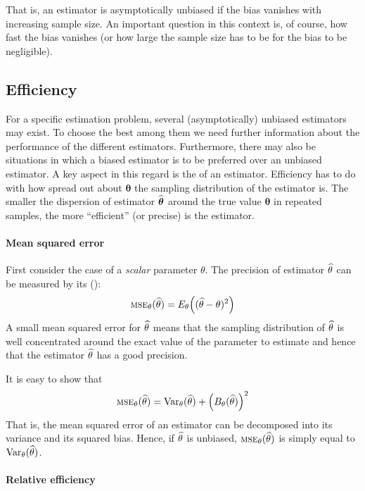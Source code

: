 That is, an estimator is asymptotically unbiased if the bias vanishes with 
increasing sample size. An important question in this context is, of course, how 
fast the bias vanishes (or how large the sample size has to be for the bias to be 
negligible).

\subsection{Efficiency}

For a specific estimation problem, several (asymptotically) unbiased estimators
may exist. To choose the best among them we need further information about the
performance of the different estimators. Furthermore, there may also be
situations in which a biased estimator is to be preferred over an unbiased
estimator. A key aspect in this regard is the \emph{} of an
estimator. Efficiency has to do with how spread out about $\boldsymbol\theta$
the sampling distribution of the estimator is. The smaller the dispersion of
estimator $\widehat{\boldsymbol\theta}$ around the true value
$\boldsymbol\theta$ in repeated samples, the more “efficient” (or precise) is
the estimator.

\paragraph{Mean squared error}

First consider the case of a \emph{scalar} parameter $\theta$. The
precision of estimator $\widehat{\theta}$ can be measured by its
\emph{} ():
\[
    \stsc{MSE}_{\theta}(\sthat{\theta}) 
    = E_{\theta} \left((\sthat{\theta} - \theta)^2\right)
\]
A small mean squared error for $\widehat{\theta}$ means that the sampling
distribution of $\widehat{\theta}$ is well concentrated around the exact value
of the parameter to estimate and hence that the estimator $\widehat{\theta}$
has a good precision.

It is easy to show that
\[
    \stsc{MSE}_{\theta}(\sthat{\theta})
    = \mathrm{Var}_{\theta}(\sthat{\theta}) 
      + \left(B_{\theta}(\sthat{\theta})\right)^2
\]
That is, the mean squared error of an estimator can be decomposed into its
variance and its squared bias. Hence, if $\widehat{\theta}$ is unbiased,
$\stsc{MSE}_{\theta}(\sthat{\theta})$ is simply equal to
$\mathrm{Var}_{\theta}(\widehat{\theta})$.

\paragraph{Relative efficiency}

